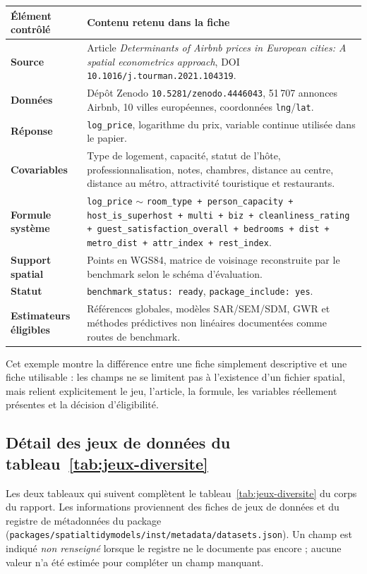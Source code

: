 \documentclass[11pt,a4paper]{article}
\begin{document}
\begin{center}
\small
\begin{tabularx}{\textwidth}{>{\bfseries}p{3.8cm}X}
\toprule
Élément contrôlé & Contenu retenu dans la fiche \\
\midrule
Source & Article \emph{Determinants of Airbnb prices in European cities: A spatial econometrics approach}, DOI \texttt{10.1016/j.tourman.2021.104319}. \\
Données & Dépôt Zenodo \texttt{10.5281/zenodo.4446043}, 51\,707 annonces Airbnb, 10 villes européennes, coordonnées \texttt{lng}/\texttt{lat}. \\
Réponse & \texttt{log\_price}, logarithme du prix, variable continue utilisée dans le papier. \\
Covariables & Type de logement, capacité, statut de l'hôte, professionnalisation, notes, chambres, distance au centre, distance au métro, attractivité touristique et restaurants. \\
Formule système & \texttt{log\_price} $\sim$ \texttt{room\_type + person\_capacity + host\_is\_superhost + multi + biz + cleanliness\_rating + guest\_satisfaction\_overall + bedrooms + dist + metro\_dist + attr\_index + rest\_index}. \\
Support spatial & Points en WGS84, matrice de voisinage reconstruite par le benchmark selon le schéma d'évaluation. \\
Statut & \texttt{benchmark\_status: ready}, \texttt{package\_include: yes}. \\
Estimateurs éligibles & Références globales, modèles SAR/SEM/SDM, GWR et méthodes prédictives non linéaires documentées comme routes de benchmark. \\
\bottomrule
\end{tabularx}
\end{center}

Cet exemple montre la différence entre une fiche simplement descriptive et une fiche utilisable : les champs ne se limitent pas à l'existence d'un fichier spatial, mais relient explicitement le jeu, l'article, la formule, les variables réellement présentes et la décision d'éligibilité.

\subsection{Détail des jeux de données du tableau~\ref{tab:jeux-diversite}}
\label{annexe:jeux-diversite-detail}

Les deux tableaux qui suivent complètent le tableau~\ref{tab:jeux-diversite} du corps du rapport. Les informations proviennent des fiches de jeux de données et du registre de métadonnées du package (\texttt{packages/spatialtidymodels/inst/metadata/datasets.json}). Un champ est indiqué \textit{non renseigné} lorsque le registre ne le documente pas encore ; aucune valeur n'a été estimée pour compléter un champ manquant.
\end{document}
